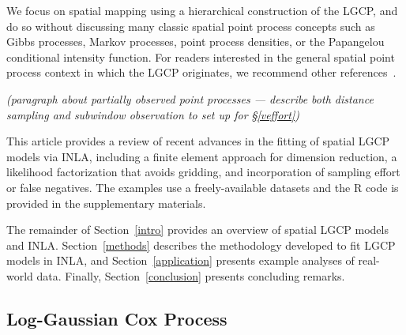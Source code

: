 \documentclass[]{interact}
\begin{document}
We focus on spatial mapping using a hierarchical construction of the LGCP, and
do so without discussing many classic spatial point process concepts such as
Gibbs processes, Markov processes, point process densities, or the Papangelou
conditional intensity function. For readers interested in the general spatial
point process context in which the LGCP originates, we recommend other
references~\cite{moellerwaagepetersen, digglepoint, cressie}.

{\it (paragraph about partially observed point processes --- describe both
distance sampling and subwindow observation to set up for \S\ref{veffort})}


This article provides a review of recent advances in the fitting of spatial
LGCP models via INLA, including a finite element approach for dimension
reduction, a likelihood factorization that avoids gridding, and incorporation
of sampling effort or false negatives. The examples use a freely-available
datasets and the R code is provided in the supplementary materials.

The remainder of Section~\ref{intro} provides an overview of spatial LGCP
models and INLA. Section~\ref{methods} describes the methodology developed to
fit LGCP models in INLA, and Section~\ref{application} presents example
analyses of real-world data. Finally, Section~\ref{conclusion} presents
concluding remarks.


\subsection{Log-Gaussian Cox Process}
\label{lgcp}




\end{document}
